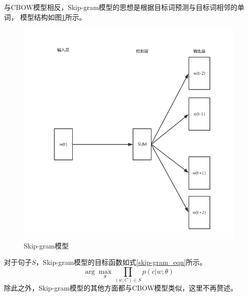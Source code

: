 与CBOW模型相反，Skip-gram模型的思想是根据目标词预测与目标词相邻的单词，
模型结构如图\ref{skip-gram}所示。
\begin{figure}[h]
    \includegraphics[scale=0.6]{picture/skip-gram.png}
    \caption{Skip-gram模型}
    \label{skip-gram}
\end{figure}
对于句子$S$，Skip-gram模型的目标函数如式\ref{skip-gram_eqn}所示。
\begin{equation}
    \arg \max_{\theta } \prod_{\left ( w,C \right )\in S}p\left ( c|w;\theta \right )
    \label{skip-gram_eqn}
\end{equation}
除此之外，Skip-gram模型的其他方面都与CBOW模型类似，这里不再赘述。


